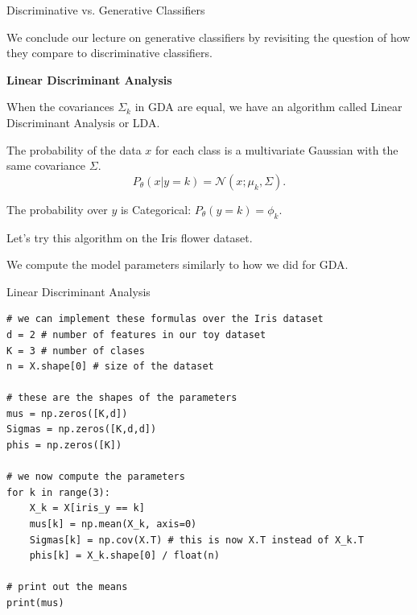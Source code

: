 \documentclass[../../generative_classifiers.tex]{subfiles}
\begin{document}
\begin{frame}[fragile]{Discriminative vs. Generative Classifiers}


We conclude our lecture on generative classifiers by revisiting the question of how they compare to discriminative classifiers.

\vspace{0.3cm}

\textbf{Linear Discriminant Analysis}

When the covariances $\Sigma_k$ in GDA are equal, we have an algorithm called Linear Discriminant Analysis or LDA.

The probability of the data $x$ for each class is a multivariate Gaussian with the same covariance $\Sigma$.
$$P_\theta(x|y=k) = \mathcal{N}(x ; \mu_k, \Sigma).$$

The probability over $y$ is Categorical:
$P_\theta(y=k) = \phi_k$.

\vspace{0.3cm}
Let's try this algorithm on the Iris flower dataset.

We compute the model parameters similarly to how we did for GDA.

\end{frame}

\begin{frame}[fragile]{Linear Discriminant Analysis}

\begin{lstlisting}
# we can implement these formulas over the Iris dataset
d = 2 # number of features in our toy dataset
K = 3 # number of clases
n = X.shape[0] # size of the dataset

# these are the shapes of the parameters
mus = np.zeros([K,d])
Sigmas = np.zeros([K,d,d])
phis = np.zeros([K])

# we now compute the parameters
for k in range(3):
    X_k = X[iris_y == k]
    mus[k] = np.mean(X_k, axis=0)
    Sigmas[k] = np.cov(X.T) # this is now X.T instead of X_k.T
    phis[k] = X_k.shape[0] / float(n)

# print out the means
print(mus)
\end{lstlisting}

\end{frame}
\end{document}
